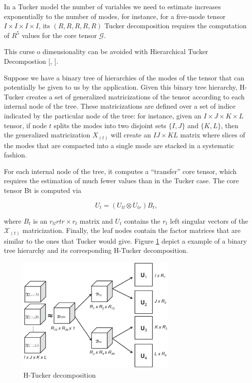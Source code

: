 \documentclass[letterpaper,12pt]{article}
\begin{document}
In a Tucker model the number of variables we need to estimate increases exponentially to the number of modes, for instance, for a five-mode tensor $I\times I\times I\times I$,  its $(R, R, R, R, R)$ Tucker decomposition requires the computation of $R^5$ values for the core tensor $\mathcal{G}$.

This curse o dimensionality can be avoided with Hierarchical Tucker Decompostion [\cite{Hackbusch2009}, \cite{Ballani2013}].

Suppose we have a binary tree of hierarchies of the modes of the tensor that can potentially be given to us by the application. Given this binary tree hierarchy, H-Tucker creates a set of generalized matricizations of the tensor according to each internal node of the tree. These matricizations are defined over a set of indice indicated by the particular node of the tree: for instance, given an $I\times J\times K\times L$ tensor, if node $t$ splits the modes into two disjoint sets $\{I, J\}$ and $\{K, L\}$, then the generalized matricization $X_{(t)}$ will create an $IJ \times KL$ matrix where slices of the modes that are compacted into a single mode are stacked in a systematic fashion. 

For each internal node of the tree, it computes a ``transfer'' core tensor, which requires the estimation of much fewer values than in the Tucker case. The core tensor Bt is computed via 

$$U_t = (U_{tl} \otimes U_{tr})B_t, $$

where $B_t$ is an $r_{tl} r{tr} \times r_t$ matrix and $U_t$ contains the $r_t$ left singular vectors of the $\mathcal{X}_(t)$ matricization. Finally, the leaf nodes contain the factor matrices that are similar to the ones that Tucker would give. Figure \ref{fig:h_tucker_bt} depict a example of a binary tree hierarchy and its corresponding H-Tucker decomposition.


\begin{figure}[!ht]
\centering
 \includegraphics[width=0.7\textwidth]{Images/h_tucker_bt.eps}
 \caption{H-Tucker decomposition \cite{Papalexakis2016}}\label{fig:h_tucker_bt}
\end{figure}
\end{document}
